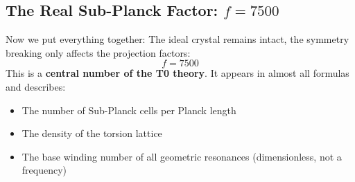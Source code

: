 	\subsection{The Real Sub-Planck Factor: \(f = 7500\)}
	Now we put everything together: The ideal crystal remains intact, the symmetry breaking only affects the projection factors:
	\begin{equation}
		\boxed{f = 7500}
	\end{equation}
	This is a \textbf{central number of the T0 theory}. It appears in almost all formulas and describes:
	\begin{itemize}
		\item The number of Sub-Planck cells per Planck length
		\item The density of the torsion lattice
		\item The base winding number of all geometric resonances (dimensionless, not a frequency)
	\end{itemize}
